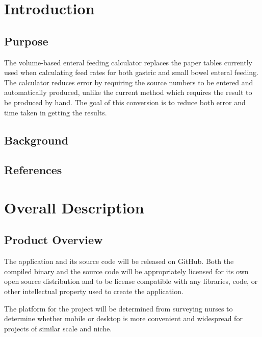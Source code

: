 \documentclass[10pt,draftclsnofoot,onecolumn]{IEEEtran}
\begin{document}
\title{}
\author{Alison Jones \& Parker Okonek}
\maketitle
\begin{abstract}
\end{abstract}
\newpage
\section{Introduction}

\subsection{Purpose}
The volume-based enteral feeding calculator replaces the paper tables currently used when 
calculating feed rates for both gastric and small bowel enteral feeding. The calculator reduces
error by requiring the source numbers to be entered and automatically produced, unlike the current
method which requires the result to be produced by hand. The goal of this conversion is to reduce both
error and time taken in getting the results.

\subsection{Background}

\subsection{References}

\section{Overall Description}
\subsection{Product Overview}
The application and its source code will be released on GitHub. Both the compiled binary and the source code
will be appropriately licensed for its own open source distribution and to be license compatible with any 
libraries, code, or other intellectual property used to create the application.

The platform for the project will be determined from surveying nurses to determine whether mobile or desktop
is more convenient and widespread for projects of similar scale and niche.
\end{document}
